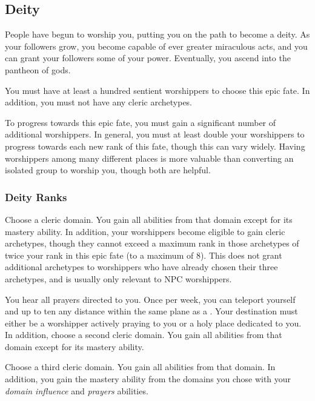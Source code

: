     \subsection{Deity}
        People have begun to worship you, putting you on the path to become a deity.
        As your followers grow, you become capable of ever greater miraculous acts, and you can grant your followers some of your power.
        Eventually, you ascend into the pantheon of gods.

         You must have at least a hundred sentient worshippers to choose this epic fate.
        In addition, you must not have any cleric archetypes.

         To progress towards this epic fate, you must gain a significant number of additional worshippers.
        In general, you must at least double your worshippers to progress towards each new rank of this fate, though this can vary widely.
        Having worshippers among many different places is more valuable than converting an isolated group to worship you, though both are helpful.

        \subsubsection{Deity Ranks}
             Choose a cleric domain.
            You gain all abilities from that domain except for its mastery ability.
            In addition, your worshippers become eligible to gain cleric archetypes, though they cannot exceed a maximum rank in those archetypes of twice your rank in this epic fate (to a maximum of 8).
            This does not grant additional archetypes to worshippers who have already chosen their three archetypes, and is usually only relevant to NPC worshippers.

             You hear all prayers directed to you.
            Once per week, you can teleport yourself and up to ten  any distance within the same plane as a .
            Your destination must either be a worshipper actively praying to you or a holy place dedicated to you.
            In addition, choose a second cleric domain.
            You gain all abilities from that domain except for its mastery ability.

             Choose a third cleric domain.
            You gain all abilities from that domain.
            In addition, you gain the mastery ability from the domains you chose with your \textit{domain influence} and \textit{prayers} abilities.

